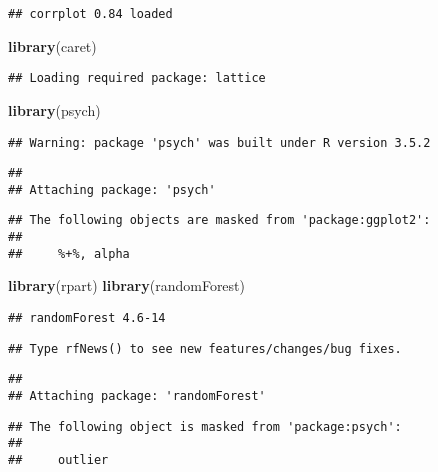 \documentclass[]{article}
\newenvironment{Shaded}{\begin{snugshade}}{\end{snugshade}}
\newcommand{\KeywordTok}[1]{\textcolor[rgb]{0.13,0.29,0.53}{\textbf{#1}}}
\newcommand{\NormalTok}[1]{#1}
\begin{document}
\begin{verbatim}
## corrplot 0.84 loaded
\end{verbatim}

\begin{Shaded}
\begin{Highlighting}[]
\KeywordTok{library}\NormalTok{(caret)}
\end{Highlighting}
\end{Shaded}

\begin{verbatim}
## Loading required package: lattice
\end{verbatim}

\begin{Shaded}
\begin{Highlighting}[]
\KeywordTok{library}\NormalTok{(psych)}
\end{Highlighting}
\end{Shaded}

\begin{verbatim}
## Warning: package 'psych' was built under R version 3.5.2
\end{verbatim}

\begin{verbatim}
## 
## Attaching package: 'psych'
\end{verbatim}

\begin{verbatim}
## The following objects are masked from 'package:ggplot2':
## 
##     %+%, alpha
\end{verbatim}

\begin{Shaded}
\begin{Highlighting}[]
\KeywordTok{library}\NormalTok{(rpart)}
\KeywordTok{library}\NormalTok{(randomForest)}
\end{Highlighting}
\end{Shaded}

\begin{verbatim}
## randomForest 4.6-14
\end{verbatim}

\begin{verbatim}
## Type rfNews() to see new features/changes/bug fixes.
\end{verbatim}

\begin{verbatim}
## 
## Attaching package: 'randomForest'
\end{verbatim}

\begin{verbatim}
## The following object is masked from 'package:psych':
## 
##     outlier
\end{verbatim}
\end{document}
